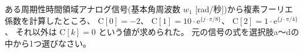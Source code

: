 ある周期性時間領域アナログ信号(基本角周波数  $w_1$ [rad/秒])から複素フーリエ係数を計算したところ、
$\textrm{C}[0] = -2$、
$\textrm{C}[1] = 10 \cdot \textrm{e}^{\{ j \cdot \pi/8 \}}$、
$\textrm{C}[2] =  1 \cdot \textrm{e}^{\{ j \cdot \pi/4 \}}$ 、
それ以外は $\textrm{C}[k] = 0$ という値が求められた。
元の信号の式を選択肢a〜dの中から1つ選びなさい。
